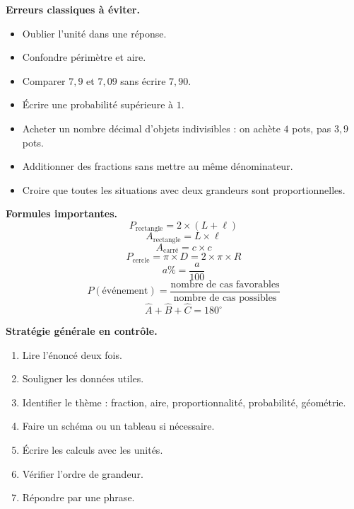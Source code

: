 \documentclass[11pt,a4paper]{article}
\begin{document}
\begin{erreurbox}
\textbf{Erreurs classiques à éviter.}
\begin{itemize}
\item Oublier l'unité dans une réponse.
\item Confondre périmètre et aire.
\item Comparer $7,9$ et $7,09$ sans écrire $7,90$.
\item Écrire une probabilité supérieure à $1$.
\item Acheter un nombre décimal d'objets indivisibles : on achète $4$ pots, pas $3,9$ pots.
\item Additionner des fractions sans mettre au même dénominateur.
\item Croire que toutes les situations avec deux grandeurs sont proportionnelles.
\end{itemize}
\end{erreurbox}

\begin{retenirbox}
\textbf{Formules importantes.}
\[
P_{\text{rectangle}}=2\times(L+\ell)
\]
\[
A_{\text{rectangle}}=L\times \ell
\]
\[
A_{\text{carré}}=c\times c
\]
\[
P_{\text{cercle}}=\pi\times D=2\times \pi\times R
\]
\[
a\%=\frac{a}{100}
\]
\[
P(\text{événement})=\frac{\text{nombre de cas favorables}}{\text{nombre de cas possibles}}
\]
\[
\widehat{A}+\widehat{B}+\widehat{C}=180^\circ
\]
\end{retenirbox}

\begin{vigilancebox}
\textbf{Stratégie générale en contrôle.}
\begin{enumerate}[label=\arabic*)]
\item Lire l'énoncé deux fois.
\item Souligner les données utiles.
\item Identifier le thème : fraction, aire, proportionnalité, probabilité, géométrie.
\item Faire un schéma ou un tableau si nécessaire.
\item Écrire les calculs avec les unités.
\item Vérifier l'ordre de grandeur.
\item Répondre par une phrase.
\end{enumerate}
\end{vigilancebox}
\end{document}
